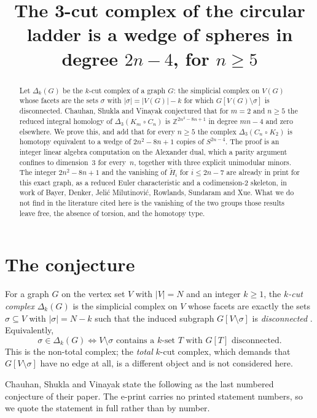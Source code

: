 \documentclass[11pt]{amsart}
\title[The 3-cut complex of the circular ladder]
{The 3-cut complex of the circular ladder is a wedge of spheres
in degree $2n-4$, for $n\ge5$}
\date{}
\theoremstyle{definition}
\newcommand{\bx}{\mathbin{\square}}
\newcommand{\Dl}{\Delta}
\newcommand{\Zm}{\mathbb{Z}}
\begin{document}
\begin{abstract}
Let $\Dl_k(G)$ be the $k$-cut complex of a graph $G$: the simplicial complex on $V(G)$ whose facets
are the sets $\sigma$ with $|\sigma|=|V(G)|-k$ for which $G[V(G)\setminus\sigma]$ is disconnected.
Chauhan, Shukla and Vinayak conjectured that for $m=2$ and $n\ge 5$ the reduced integral homology of
$\Dl_3(K_m\bx C_n)$ is $\Zm^{2n^2-8n+1}$ in degree $mn-4$ and zero elsewhere. We prove this, and
add that for every $n\ge5$ the complex $\Dl_3(C_n\bx K_2)$ is homotopy equivalent to a wedge of
$2n^2-8n+1$ copies of $S^{2n-4}$. The proof is an integer linear algebra computation on the
Alexander dual, which a parity argument confines to dimension~$3$ for every~$n$, together with three
explicit unimodular minors. The integer $2n^2-8n+1$ and the vanishing of $\widetilde H_i$ for
$i\le 2n-7$ are already in print for this exact graph, as a reduced Euler characteristic and a
codimension-$2$ skeleton, in work of Bayer, Denker, Jeli\'c Milutinovi\'c, Rowlands, Sundaram and
Xue. What we do not find in the literature cited here is the vanishing of the two groups those
results leave free, the absence of torsion, and the homotopy type.
\end{abstract}

\maketitle

\section{The conjecture}\label{sec:conj}

For a graph $G$ on the vertex set $V$ with $|V|=N$ and an integer $k\ge1$, the \emph{$k$-cut complex}
$\Dl_k(G)$ is the simplicial complex on $V$ whose facets are exactly the sets $\sigma\subseteq V$ with
$|\sigma|=N-k$ such that the induced subgraph $G[V\setminus\sigma]$ is \emph{disconnected}
\cite{BayerI}. Equivalently,
\begin{equation}\label{eq:facechar}
 \sigma\in\Dl_k(G)
 \iff
 \text{$V\setminus\sigma$ contains a $k$-set $T$ with $G[T]$ disconnected.}
\end{equation}
This is the non-total complex; the \emph{total} $k$-cut complex, which demands that
$G[V\setminus\sigma]$ have no edge at all, is a different object and is not considered here.

Chauhan, Shukla and Vinayak \cite{CSV} state the following as the last numbered conjecture of their
paper. The e-print carries no printed statement numbers, so we quote the statement in full rather
than by number.
\end{document}
